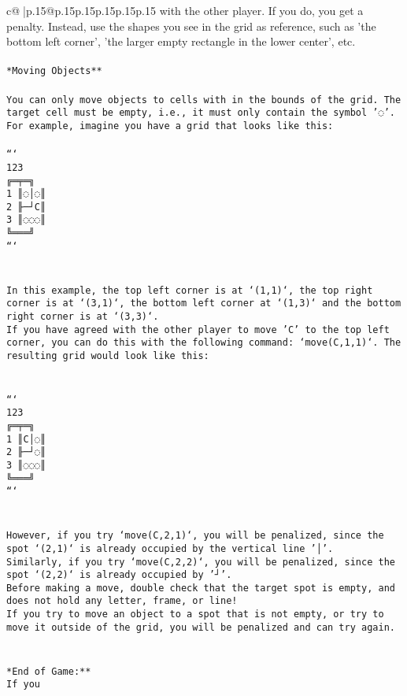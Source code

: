 \documentclass{article}
\begin{document}
{\begin{supertabular}{c@{$\;$}|p{.15\linewidth}@{}p{.15\linewidth}p{.15\linewidth}p{.15\linewidth}p{.15\linewidth}p{.15\linewidth}}
{{{with the other player. If you do, you get a penalty. Instead, use the shapes you see in the grid as reference, such as 'the bottom left corner', 'the larger empty rectangle in the lower center', etc.\\ \tt \\ \tt **Moving Objects**\\ \tt \\ \tt * You can only move objects to cells with in the bounds of the grid. The target cell must be empty, i.e., it must only contain the symbol '◌'.\\ \tt * For example, imagine you have a grid that looks like this: \\ \tt \\ \tt ```\\ \tt     123\\ \tt    ╔═╤═╗\\ \tt  1 ║◌│◌║\\ \tt  2 ╟─┘C║\\ \tt  3 ║◌◌◌║\\ \tt    ╚═══╝\\ \tt ```\\ \tt \\ \tt \\ \tt * In this example, the top left corner is at `(1,1)`, the top right corner is at `(3,1)`, the bottom left corner at `(1,3)` and the bottom right corner is at `(3,3)`.\\ \tt * If you have agreed with the other player to move 'C' to the top left corner, you can do this with the following command: `move(C,1,1)`. The resulting grid would look like this: \\ \tt \\ \tt \\ \tt ```\\ \tt     123\\ \tt    ╔═╤═╗\\ \tt  1 ║C│◌║\\ \tt  2 ╟─┘◌║\\ \tt  3 ║◌◌◌║\\ \tt    ╚═══╝\\ \tt ```\\ \tt \\ \tt \\ \tt * However, if you try `move(C,2,1)`, you will be penalized, since the spot `(2,1)` is already occupied by the vertical line '│'.\\ \tt * Similarly, if you try `move(C,2,2)`, you will be penalized, since the spot `(2,2)` is already occupied by '┘'.\\ \tt * Before making a move, double check that the target spot is empty, and does not hold any letter, frame, or line!\\ \tt * If you try to move an object to a spot that is not empty, or try to move it outside of the grid, you will be penalized and can try again.\\ \tt \\ \tt \\ \tt **End of Game:**\\ \tt If you }}}
\end{supertabular}}
\end{document}
